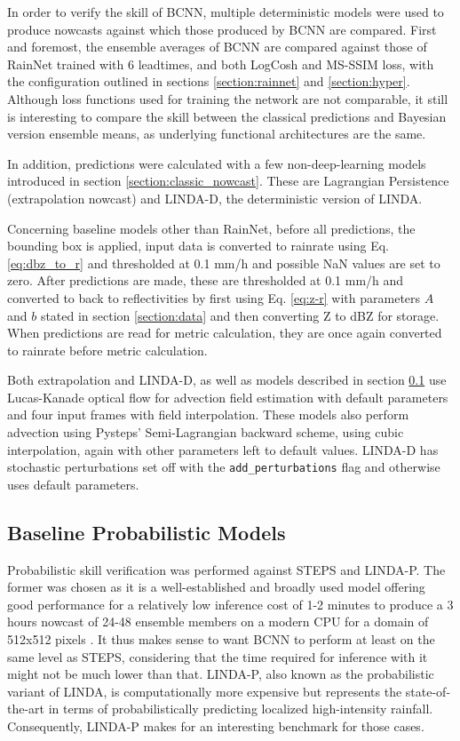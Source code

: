 In order to verify the skill of BCNN, multiple deterministic models were used to produce nowcasts against which those produced by BCNN are compared. First and foremost, the ensemble averages of BCNN are compared against those of RainNet trained with 6 leadtimes, and both LogCosh and MS-SSIM loss, with the configuration outlined in sections \ref{section:rainnet} and \ref{section:hyper}. Although loss functions used for training the network are not comparable, it still is interesting to compare the skill between the classical predictions and Bayesian version ensemble means, as underlying functional architectures are the same.

In addition, predictions were calculated with a few non-deep-learning models introduced in section \ref{section:classic_nowcast}. These are Lagrangian Persistence (extrapolation nowcast) and LINDA-D, the deterministic version of LINDA.

Concerning baseline models other than RainNet, before all predictions, the bounding box is applied, input data is converted to rainrate using Eq. \ref{eq:dbz_to_r} and thresholded at 0.1 mm/h and possible NaN values are set to zero. After predictions are made, these are thresholded at 0.1 mm/h and converted to back to reflectivities by first using Eq. \ref{eq:z-r} with parameters $A$ and $b$ stated in section \ref{section:data} and then converting Z to dBZ for storage. When predictions are read for metric calculation, they are once again converted to rainrate before metric calculation.

Both extrapolation and LINDA-D, as well as models described in section \ref{section:prob_model} use Lucas-Kanade optical flow for advection field estimation with default parameters and four input frames with field interpolation. These models also perform advection using Pysteps' Semi-Lagrangian backward scheme, using cubic interpolation, again with other parameters left to default values. LINDA-D has stochastic  perturbations set off with the \texttt{add\_perturbations} flag and otherwise uses default parameters. 


\subsection{Baseline Probabilistic Models}
\label{section:prob_model}

Probabilistic skill verification was performed against STEPS and LINDA-P. The former was chosen as it is a well-established and broadly used model offering good performance for a relatively low inference cost of 1-2 minutes to produce a 3 hours nowcast of 24-48 ensemble members on a modern CPU for a domain of 512x512 pixels \cite{pulkkinen_pysteps_2019}. It thus makes sense to want BCNN to perform at least on the same level as STEPS, considering that the time required for inference with it might not be much lower than that. LINDA-P, also known as the probabilistic variant of LINDA, is computationally more expensive but represents the state-of-the-art in terms of probabilistically predicting localized high-intensity rainfall. Consequently, LINDA-P makes for an interesting benchmark for those cases. 

